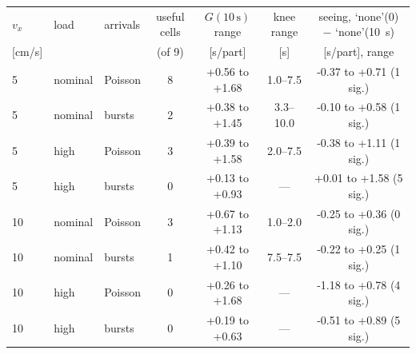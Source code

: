 \begin{tabular}{@{}lllcccc@{}}
\toprule
$v_x$ & load & arrivals & useful cells & $G(10\,\mathrm{s})$ range & knee range & seeing, `none'(0) $-$ `none'(10~s) \\
{[cm/s]} & & & (of 9) & [s/part] & [s] & [s/part], range \\
\midrule
5 & nominal & Poisson & 8 & +0.56 to +1.68 & 1.0--7.5 & -0.37 to +0.71 (1 sig.) \\
5 & nominal & bursts & 2 & +0.38 to +1.45 & 3.3--10.0 & -0.10 to +0.58 (1 sig.) \\
5 & high & Poisson & 3 & +0.39 to +1.58 & 2.0--7.5 & -0.38 to +1.11 (1 sig.) \\
5 & high & bursts & 0 & +0.13 to +0.93 & --- & +0.01 to +1.58 (5 sig.) \\
\midrule
10 & nominal & Poisson & 3 & +0.67 to +1.13 & 1.0--2.0 & -0.25 to +0.36 (0 sig.) \\
10 & nominal & bursts & 1 & +0.42 to +1.10 & 7.5--7.5 & -0.22 to +0.25 (1 sig.) \\
10 & high & Poisson & 0 & +0.26 to +1.68 & --- & -1.18 to +0.78 (4 sig.) \\
10 & high & bursts & 0 & +0.19 to +0.63 & --- & -0.51 to +0.89 (5 sig.) \\
\bottomrule
\end{tabular}
